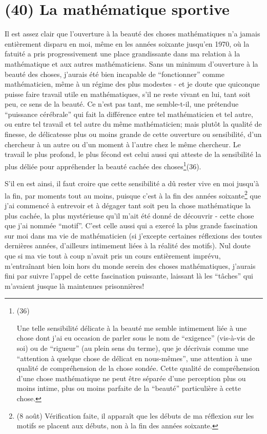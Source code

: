 \section{(40) La mathématique sportive}

Il est assez clair que l'ouverture à la beauté des choses mathématiques n'a jamais entièrement disparu en moi, même en les années soixante jusqu'en 1970, où la fatuité a pris progressivement une place grandissante dans ma relation à la mathématique et aux autres mathématiciens. Sans un minimum d'ouverture à la beauté des choses, j'aurais été bien incapable de ``fonctionner'' comme mathématicien, même à un régime des plus modestes - et je doute que quiconque puisse faire travail utile en mathématiques, s'il ne reste vivant en lui, tant soit peu, ce sens de la beauté. Ce n'est pas tant, me semble-t-il, une prétendue ``puissance cérébrale'' qui fait la différence entre tel mathématicien et tel autre, ou entre tel travail et tel autre du même mathématicien; mais plutôt la qualité de finesse, de délicatesse plus ou moins grande de cette ouverture ou sensibilité, d'un chercheur à un autre ou d'un moment à l'autre chez le même chercheur. Le travail le plus profond, le plus fécond est celui aussi qui atteste de la sensibilité la plus déliée pour appréhender la beauté cachée des choses\footnote{(36) \par Une telle sensibilité délicate à la beauté me semble intimement liée à une chose dont j'ai eu occasion de parler sous le nom de ``exigence'' (vis-à-vis de soi) ou de ``rigueur'' (au plein sens du terme), que je décrivais comme une ``attention à quelque chose de délicat en nous-mêmes'', une attention à une qualité de compréhension de la chose sondée. Cette qualité de compréhension d'une chose mathématique ne peut être séparée d'une perception plus ou moins intime, plus ou moins parfaite de la ``beauté'' particulière à cette chose.}(36).

S'il en est ainsi, il faut croire que cette sensibilité a dû rester vive en moi jusqu'à la fin, par moments tout au moins, puisque c'est à la fin des années soixante\footnote{(8 août) Vérification faite, il apparaît que les débuts de ma réflexion sur les motifs se placent aux débuts, non à la fin des années soixante.} que j'ai commencé à entrevoir et à dégager tant soit peu la chose mathématique la plus cachée, la plus mystérieuse qu'il m'ait été donné de découvrir - cette chose que j'ai nommée ``motif''. C'est celle aussi qui a exercé la plus grande fascination sur moi dans ma vie de mathématicien (si j'excepte certaines réflexions des toutes dernières années, d'ailleurs intimement liées à la réalité des motifs). Nul doute que si ma vie tout à coup n'avait pris un cours entièrement imprévu, m'entraînant bien loin hors du monde serein des choses mathématiques, j'aurais fini par suivre l'appel de cette fascination puissante, laissant là les ``tâches'' qui m'avaient jusque là maintenues prisonnières!

